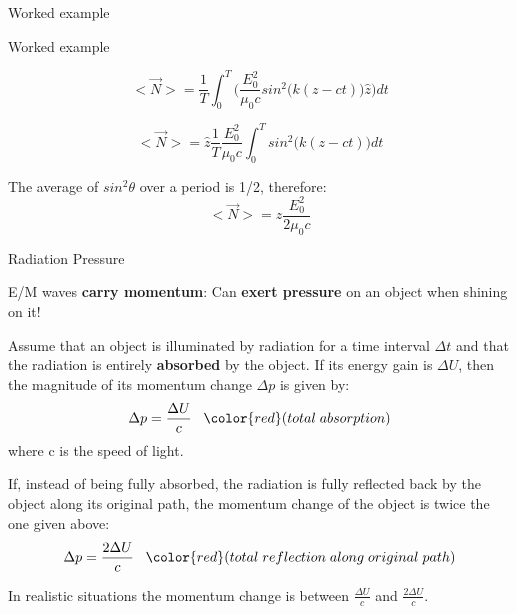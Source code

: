 {\begin{frame}{Worked example}
\end{frame}

%
%
%
%

\begin{frame}{Worked example}

\begin{equation*}
  <\vec{N}> = \frac{1}{T} \int_{0}^{T} \Big( \frac{E_0^2}{\mu_0 c} sin^{2}\Big( k(z-ct) \Big) \hat{z} \Big) dt
\end{equation*}

\begin{equation*}
  <\vec{N}> =  \hat{z} \frac{1}{T} \frac{E_0^2}{\mu_0 c} \int_{0}^{T} sin^{2}\Big( k(z-ct) \Big) dt
\end{equation*}

\vspace{0.2cm}

The average of $sin^{2}\theta$ over a period is 1/2, therefore:
\begin{equation*}
  <\vec{N}> =  \hat{z} \frac{E_0^2}{2 \mu_0 c}
\end{equation*}

\end{frame}

} %


%
%
%
%

\begin{frame}{Radiation Pressure}

E/M waves {\bf carry momentum}:
Can {\bf exert pressure} on an object when shining on it!\\
\vspace{0.1cm}

Assume that an object
is illuminated by radiation for a time interval ${\Delta}t$ and that
the radiation is entirely {\bf absorbed} by the object.
If its energy gain is ${\Delta}U$, then the magnitude of its momentum
change ${\Delta}p$ is given by:
\begin{equation*}
  {\Delta}p = \frac{{\Delta}U}{c}
  \;\;\; {\color{red} (total \; absorption)}
\end{equation*}
where c is the speed of light.\\
\vspace{0.1cm}

If, instead of being fully absorbed, the radiation is fully reflected back
by the object along its original path, the momentum change of the
object is twice  the one given above:
\begin{equation*}
  {\Delta}p = \frac{2{\Delta}U}{c}
  \;\;\; {\color{red} (total \; reflection \; along \; original \; path)}
\end{equation*}

In realistic situations the momentum change is between $\frac{{\Delta}U}{c}$
and $\frac{2{\Delta}U}{c}$.

\end{frame}

